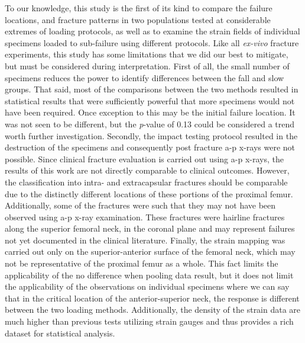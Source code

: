 To our knowledge, this study is the first of its kind to compare the failure locations, and fracture patterns in two populations tested at considerable extremes of loading protocols, as well as to examine the strain fields of individual specimens loaded to sub-failure using different protocols.
Like all \textit{ex-vivo} fracture experiments, this study has some limitations that we did our best to mitigate, but must be considered during interpretation.
First of all, the small number of specimens reduces the power to identify differences between the fall and slow groups.
That said, most of the comparisons between the two methods resulted in statistical results that were sufficiently powerful that more specimens would not have been required.
Once exception to this may be the initial failure location.
It was not seen to be different, but the \textit{p}-value of 0.13 could be considered a trend worth further investigation.
Secondly, the impact testing protocol resulted in the destruction of the specimens and consequently post fracture \ac{a-p} x-rays were not possible.
Since clinical fracture evaluation is carried out using \ac{a-p} x-rays, the results of this work are not directly comparable to clinical outcomes.
However, the classification into intra- and extracapsular fractures should be comparable due to the distinctly different locations of these portions of the proximal femur.
Additionally, some of the fractures were such that they may not have been observed using a-p x-ray examination.
These fractures were hairline fractures along the superior femoral neck, in the coronal plane and may represent failures not yet documented in the clinical literature.
Finally, the strain mapping was carried out only on the superior-anterior surface of the femoral neck, which may not be representative of the proximal femur as a whole.
This fact limits the applicability of the no difference when pooling data result, but it does not limit the applicability of the observations on individual specimens where we can say that in the critical location of the anterior-superior neck, the response is different between the two loading methods.
Additionally, the density of the strain data are much higher than previous tests utilizing strain gauges and thus provides a rich dataset for statistical analysis.

